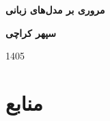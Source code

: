 \documentclass[12pt,a4paper]{article}
\begin{document}
	
	\begin{titlepage}
		\centering
		\vspace*{2.5cm}
		{\Huge \bfseries \textcolor{blue!70!black}{مروری بر مدل‌های زبانی}\par}
		\vspace{16cm}
		{\Large \bfseries سپهر کراچی\par}
		\vspace{0.5cm}
		{\Large 1405\par}
		\vfill
	\end{titlepage}
	
	\newpage
	\renewcommand{\contentsname}{فهرست مطالب}
	\tableofcontents
	\newpage
	
	
	
	
	
	
	
	
	
	\newpage
	\section{منابع}
	\renewcommand{\refname}{منابع} 
	\begin{latin}
		\nocite{*}
		 
		 
	\end{latin}
	
\end{document}
